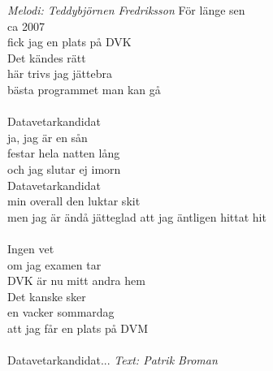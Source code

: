 {\footnotesize\textit{Melodi: Teddybjörnen Fredriksson}}
\vspace{10pt}
För länge sen\\
ca 2007\\
fick jag en plats på DVK\\
Det kändes rätt\\
här trivs jag jättebra\\
bästa programmet man kan gå\\
\\
Datavetarkandidat\\
ja, jag är en sån\\
festar hela natten lång\\
och jag slutar ej imorn\\
Datavetarkandidat\\
min overall den luktar skit\\
men jag är ändå jätteglad att jag äntligen hittat hit\\
\\
Ingen vet\\
om jag examen tar\\
DVK är nu mitt andra hem\\
Det kanske sker\\
en vacker sommardag\\
att jag får en plats på DVM\\
\\
Datavetarkandidat...
\vspace{10pt}
{\footnotesize\textit{Text: Patrik Broman}}